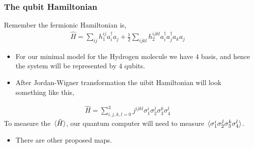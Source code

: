 \documentclass{beamer}
\renewcommand{\(}{\left(}
\renewcommand{\)}{\right)}
\renewcommand{\[}{\left[}
\renewcommand{\]}{\right]}
\begin{document}


\begin{frame}
    \frametitle{The qubit Hamiltonian}

    Remember the fermionic Hamiltonian is, 
    \begin{align*}
        \hat{H} = \sum_{ij} h^{ij}_1 a_i^\dagger a_j + \frac{1}{2} \sum_{ijkl} h_2^{ijkl} a_i^\dagger a_j^\dagger a_k a_j 
    \end{align*} 
    \begin{itemize}
        \item For our minimal model for the Hydrogen molecule we have $4$ basis, and hence the system will be represented by $4$ qubits. 
        \item After Jordan-Wigner transformation the uibit Hamiltonian will look something like this,
    \end{itemize}
     
    \begin{align*}
        \hat{H} = \sum_{i,j,k,l = 0}^ 3 j^{ijkl} \sigma^i_1 \sigma^j_2 \sigma^k_3 \sigma^l_4 
    \end{align*}
    To measure the $\expval*{\hat{H}}$, our quantum computer will need to measure $\expval*{\sigma^i_1 \sigma^j_2 \sigma^k_3 \sigma^l_4}$.
    \begin{itemize}
        \item There are other proposed maps. 
    \end{itemize}
\end{frame}
\end{document}
